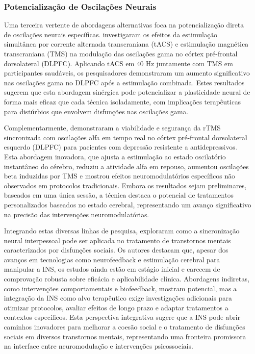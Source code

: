 \subsubsection{Potencialização de Oscilações Neurais}
Uma terceira vertente de abordagens alternativas foca na potencialização direta de oscilações neurais específicas.  investigaram os efeitos da estimulação simultânea por corrente alternada transcraniana (tACS) e estimulação magnética transcraniana (TMS) na modulação das oscilações gama no córtex pré-frontal dorsolateral (DLPFC). Aplicando tACS em 40 Hz juntamente com TMS em participantes saudáveis, os pesquisadores demonstraram um aumento significativo nas oscilações gama no DLPFC após a estimulação combinada. Estes resultados sugerem que esta abordagem sinérgica pode potencializar a plasticidade neural de forma mais eficaz que cada técnica isoladamente, com implicações terapêuticas para distúrbios que envolvem disfunções nas oscilações gama.

Complementarmente,  demonstraram a viabilidade e segurança da rTMS sincronizada com oscilações alfa em tempo real no córtex pré-frontal dorsolateral esquerdo (DLPFC) para pacientes com depressão resistente a antidepressivos. Esta abordagem inovadora, que ajusta a estimulação ao estado oscilatório instantâneo do cérebro, reduziu a atividade alfa em repouso, aumentou oscilações beta induzidas por TMS e mostrou efeitos neuromodulatórios específicos não observados em protocolos tradicionais. Embora os resultados sejam preliminares, baseados em uma única sessão, a técnica destaca o potencial de tratamentos personalizados baseados no estado cerebral, representando um avanço significativo na precisão das intervenções neuromodulatórias.

Integrando estas diversas linhas de pesquisa,  exploraram como a sincronização neural interpessoal pode ser aplicada no tratamento de transtornos mentais caracterizados por disfunções sociais. Os autores destacam que, apesar dos avanços em tecnologias como neurofeedback e estimulação cerebral para manipular a INS, os estudos ainda estão em estágio inicial e carecem de comprovação robusta sobre eficácia e aplicabilidade clínica. Abordagens indiretas, como intervenções comportamentais e biofeedback, mostram potencial, mas a integração da INS como alvo terapêutico exige investigações adicionais para otimizar protocolos, avaliar efeitos de longo prazo e adaptar tratamentos a contextos específicos. Esta perspectiva integrativa sugere que a INS pode abrir caminhos inovadores para melhorar a coesão social e o tratamento de disfunções sociais em diversos transtornos mentais, representando uma fronteira promissora na interface entre neuromodulação e intervenções psicossociais.

